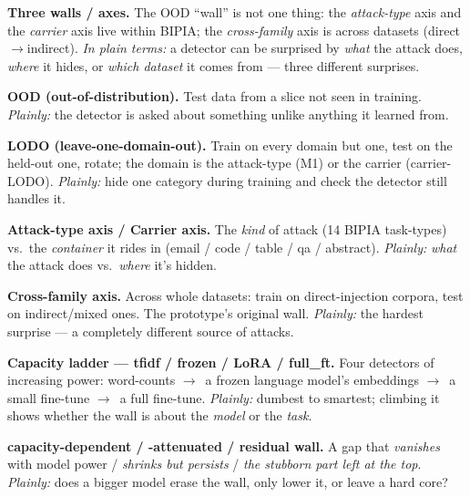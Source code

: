 \documentclass[11pt,parskip=half-]{scrartcl}
\newcommand{\arr}{\ensuremath{\rightarrow}}
\begin{document}
\newcommand{\gloss}[1]{\textbf{#1}}
\begin{description}[leftmargin=0pt,style=unboxed,itemsep=3pt]
\item[] \gloss{Three walls / axes.} The OOD ``wall'' is not one thing: the \emph{attack-type} axis and
  the \emph{carrier} axis live within BIPIA; the \emph{cross-family} axis is across datasets
  (direct\arr indirect). \emph{In plain terms:} a detector can be surprised by \emph{what} the attack
  does, \emph{where} it hides, or \emph{which dataset} it comes from --- three different surprises.

\item[] \gloss{OOD (out-of-distribution).} Test data from a slice not seen in training. \emph{Plainly:}
  the detector is asked about something unlike anything it learned from.

\item[] \gloss{LODO (leave-one-domain-out).} Train on every domain but one, test on the held-out one,
  rotate; the domain is the attack-type (M1) or the carrier (carrier-LODO). \emph{Plainly:} hide one
  category during training and check the detector still handles it.

\item[] \gloss{Attack-type axis / Carrier axis.} The \emph{kind} of attack (14 BIPIA task-types) vs.\ the
  \emph{container} it rides in (email / code / table / qa / abstract). \emph{Plainly:} \emph{what} the
  attack does vs.\ \emph{where} it's hidden.

\item[] \gloss{Cross-family axis.} Across whole datasets: train on direct-injection corpora, test on
  indirect/mixed ones. The prototype's original wall. \emph{Plainly:} the hardest surprise --- a
  completely different source of attacks.

\item[] \gloss{Capacity ladder --- tfidf / frozen / LoRA / full\_ft.} Four detectors of increasing
  power: word-counts \arr\ a frozen language model's embeddings \arr\ a small fine-tune \arr\ a full
  fine-tune. \emph{Plainly:} dumbest to smartest; climbing it shows whether the wall is about the
  \emph{model} or the \emph{task}.

\item[] \gloss{capacity-dependent / -attenuated / residual wall.} A gap that \emph{vanishes} with model
  power / \emph{shrinks but persists} / \emph{the stubborn part left at the top}. \emph{Plainly:} does a
  bigger model erase the wall, only lower it, or leave a hard core?


\end{description}
\end{document}
